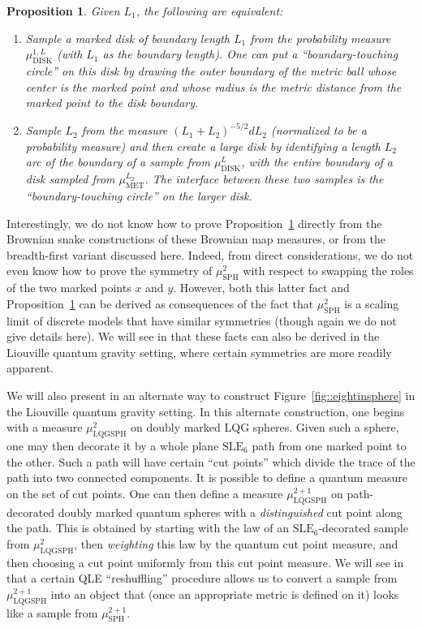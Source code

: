 \documentclass[10pt]{amsart}
\theoremstyle{plain}
\numberwithin{theorem}{section}
\newtheorem{proposition}[theorem]{Proposition}
\theoremstyle{definition}
\newcommand{\SLE}{\mathrm{SLE}}
\newcommand{\mustwo}{\mu_{\mathrm{SPH}}^2}
\newcommand{\mustwoplusone}{\mu_{\mathrm{SPH}}^{2+1}}
\newcommand{\mudonel}{\mu_{ \mathrm{DISK}}^{1, L}}
\newcommand{\mudl}{\mu_{\mathrm{DISK}}^L}
\def\mumlset#1{\mu_{\mathrm{MET}}^{#1}}
\begin{document}
\begin{proposition}
\label{prop::twowaystobuildmarkeddisc}
Given $L_1$, the following are equivalent:
\begin{enumerate}
\item Sample a marked disk of boundary length $L_1$ from the probability measure $\mudonel$ (with $L_1$ as the boundary length). One can put a ``boundary-touching circle'' on this disk by drawing the outer boundary of the metric ball whose center is the marked point and whose radius is the metric distance from the marked point to the disk boundary.
\item Sample $L_2$ from the measure $(L_1 + L_2)^{-5/2}dL_2$ (normalized to be a probability measure) and then create a large disk by identifying a length $L_2$ arc of the boundary of a sample from $\mudl$, with the entire boundary of a disk sampled from $\mumlset{L_2}$. The interface between these two samples is the ``boundary-touching circle'' on the larger disk.
\end{enumerate}
\end{proposition}

Interestingly, we do not know how to prove Proposition~\ref{prop::twowaystobuildmarkeddisc} directly from the Brownian snake constructions of these Brownian map measures, or from the breadth-first variant discussed here. Indeed, from direct considerations, we do not even know how to prove the symmetry of $\mustwo$ with respect to swapping the roles of the two marked points $x$ and $y$. However, both this latter fact and Proposition~\ref{prop::twowaystobuildmarkeddisc} can be derived as consequences of the fact that $\mustwo$ is a scaling limit of discrete models that have similar symmetries (though again we do not give details here). We will see in \cite{qlebm, qle_continuity} that these facts can also be derived in the Liouville quantum gravity setting, where certain symmetries are more readily apparent.

We will also present in \cite{qlebm, qle_continuity} an alternate way to construct Figure~\ref{fig::eightinsphere} in the Liouville quantum gravity setting. In this alternate construction, one begins with a measure $\mu^2_{\mathrm{LQGSPH}}$ on doubly marked LQG spheres. Given such a sphere, one may then decorate it by a whole plane $\SLE_6$ path from one marked point to the other. Such a path will have certain ``cut points'' which divide the trace of the path into two connected components. It is possible to define a quantum measure on the set of cut points. One can then define a measure $\mu^{2+1}_{\mathrm{LQGSPH}}$ on path-decorated doubly marked quantum spheres with a \emph{distinguished} cut point along the path. This is obtained by starting with the law of an $\SLE_6$-decorated sample from $\mu^2_{\mathrm{LQGSPH}}$, then \emph{weighting} this law by the quantum cut point measure, and then choosing a cut point uniformly from this cut point measure. We will see in \cite{qlebm, qle_continuity} that a certain QLE ``reshuffling'' procedure allows us to convert a sample from $\mu^{2+1}_{\mathrm{LQGSPH}}$ into an object that (once an appropriate metric is defined on it) looks like a sample from $\mustwoplusone$.
\end{document}
